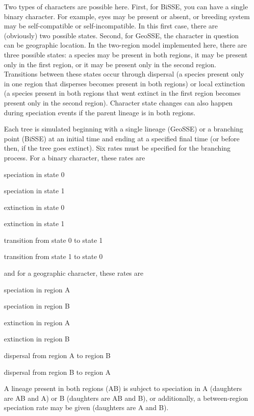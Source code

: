 \documentclass[10pt]{article}
\begin{document}
Two types of characters are possible here.
First, for BiSSE, you can have a single binary character.
For example, eyes may be present or absent, or breeding system may be self-compatible or self-incompatible.
In this first case, there are (obviously) two possible states.
Second, for GeoSSE, the character in question can be geographic location.
In the two-region model implemented here, there are three possible states: a species may be present in both regions, it may be present only in the first region, or it may be present only in the second region.
Transitions between these states occur through dispersal (a species present only in one region that disperses becomes present in both regions) or local extinction (a species present in both regions that went extinct in the first region becomes present only in the second region).
Character state changes can also happen during speciation events if the parent lineage is in both regions.

Each tree is simulated beginning with a single lineage (GeoSSE) or a branching point (BiSSE) at an initial time and ending at a specified final time (or before then, if the tree goes extinct).
Six rates must be specified for the branching process.
For a binary character, these rates are
\begin{tightlist}
\item speciation in state 0
\item speciation in state 1
\item extinction in state 0
\item extinction in state 1
\item transition from state 0 to state 1
\item transition from state 1 to state 0
\end{tightlist}
and for a geographic character, these rates are
\begin{tightlist}
\item speciation in region A
\item speciation in region B
\item extinction in region A
\item extinction in region B
\item dispersal from region A to region B
\item dispersal from region B to region A
\end{tightlist}
A lineage present in both regions (AB) is subject to speciation in A (daughters are AB and A) or B (daughters are AB and B), or additionally, a between-region speciation rate may be given (daughters are A and B).
\end{document}
